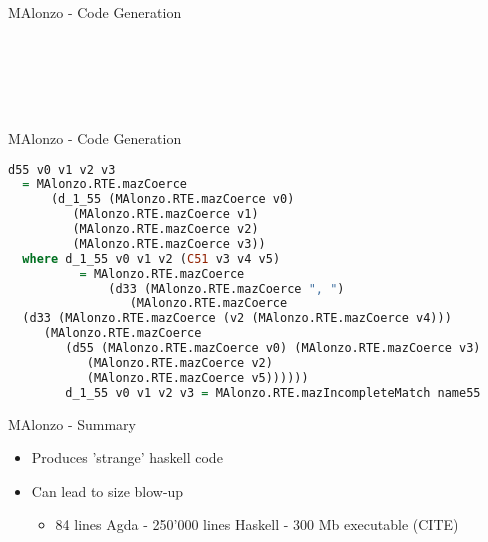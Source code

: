 \begin{frame}[fragile]{MAlonzo - Code Generation}
\begin{code}%
\> \AgdaSymbol{:}  \AgdaSymbol{\{} \AgdaSymbol{\}}  \AgdaSymbol{(}  \AgdaSymbol{)}\<%
\\
\>[2]\<[4]%
\>[4]     \<%
\\
\>  \AgdaInductiveConstructor{[]} \AgdaSymbol{=} \<%
\\
\>  \AgdaSymbol{(} \AgdaInductiveConstructor{::} \AgdaSymbol{)} \AgdaSymbol{=}  \AgdaFunction{++} \AgdaSymbol{((} \AgdaSymbol{)}\<%
\\
\>[2]\<[4]%
\>[4]\AgdaFunction{++} \AgdaSymbol{(}  \AgdaSymbol{))}\<%
\end{code}


%
\end{frame}

\begin{frame}[fragile]{MAlonzo - Code Generation}
\begin{lstlisting}[language=Haskell,basicstyle=\scriptsize]
d55 v0 v1 v2 v3
  = MAlonzo.RTE.mazCoerce
      (d_1_55 (MAlonzo.RTE.mazCoerce v0)
         (MAlonzo.RTE.mazCoerce v1)
         (MAlonzo.RTE.mazCoerce v2)
         (MAlonzo.RTE.mazCoerce v3))
  where d_1_55 v0 v1 v2 (C51 v3 v4 v5)
          = MAlonzo.RTE.mazCoerce
              (d33 (MAlonzo.RTE.mazCoerce ", ")
                 (MAlonzo.RTE.mazCoerce
  (d33 (MAlonzo.RTE.mazCoerce (v2 (MAlonzo.RTE.mazCoerce v4)))
     (MAlonzo.RTE.mazCoerce
        (d55 (MAlonzo.RTE.mazCoerce v0) (MAlonzo.RTE.mazCoerce v3)
           (MAlonzo.RTE.mazCoerce v2)
           (MAlonzo.RTE.mazCoerce v5))))))
        d_1_55 v0 v1 v2 v3 = MAlonzo.RTE.mazIncompleteMatch name55
\end{lstlisting}
\end{frame}

\begin{frame}{MAlonzo - Summary}
\begin{itemize}
  \item Produces 'strange' haskell code
  \item Can lead to size blow-up
  \begin {itemize}
    \item 84 lines Agda - 250'000 lines Haskell - 300 Mb executable (CITE)
  \end{itemize}
\end{itemize}
\end{frame}

